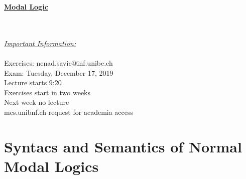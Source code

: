 \documentclass{report}
\begin{document}
 \begin{center}
 \huge{\textbf{\underline{Modal Logic}}}
 \end{center}
 \hfill \\ \\
 
 \underline{\textit{Important Information:}} \\ \\
 Exercises: nenad.savic@inf.unibe.ch \\
 Exam: Tuesday, December 17, 2019 \\
 Lecture starts 9:20 \\
 Exercises start in two weeks \\
 Next week no lecture \\
 mcs.unibnf.ch request for academia access \\
 
 \chapter{Syntacs and Semantics of Normal Modal Logics}
\end{document}
